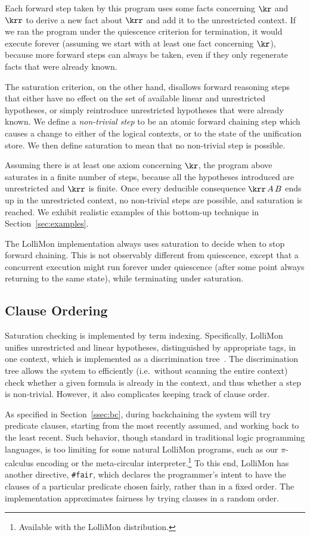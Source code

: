 \documentclass{sig-alt}
\begin{document}
Each forward step taken by this program uses some facts concerning
$\kr$ and $\krr$ to derive a new fact about $\krr$ and add it to the
unrestricted context.  If we ran the program under the quiescence
criterion for termination, it would execute forever (assuming we
start with at least one fact concerning $\kr$), because more forward
steps can always be taken, even if they only regenerate facts that
were already known.

The saturation criterion, on the other hand, disallows forward
reasoning steps that either have no effect on the set of available
linear and unrestricted hypotheses, or simply reintroduce unrestricted
hypotheses that were already known.  We define a \emph{non-trivial
  step} to be an atomic forward chaining step which causes a change to
either of the logical contexts, or to the state of the unification
store.  We then define saturation to mean that no non-trivial step is
possible.

Assuming there is at least one axiom concerning $\kr$, the program above
saturates in a finite number of steps, because all the hypotheses
introduced are unrestricted and $\krr$ is finite.  Once every
deducible consequence $\krr\,A\,B$ ends up in the unrestricted context,
no non-trivial steps are possible, and saturation is reached.  We exhibit
realistic examples of this bottom-up technique in
Section~\ref{sec:examples}.

The LolliMon implementation always uses saturation to decide when to
stop forward chaining.  This is not observably different from quiescence,
except that a concurrent execution might run forever under quiescence
(after some point always returning to the same state), while terminating
under saturation.

\subsection{Clause Ordering}
\label{ssec:ordering}
Saturation checking is implemented by
term indexing.  Specifically, LolliMon unifies unrestricted and linear
hypotheses, distinguished by
appropriate tags, in one context, which is implemented as a discrimination
tree~\cite{RSV01}.  The discrimination tree allows the
system to efficiently (i.e.\ without scanning the entire context) check
whether a given formula is already in the context, and thus whether a
step is non-trivial. However, it also complicates keeping track of clause
order.  

As specified in Section~\ref{ssec:bc}, during backchaining the
system will try predicate clauses, starting from
the most recently assumed, and working back to the least recent.
Such behavior, though standard in traditional logic
programming languages, is too limiting for some natural LolliMon
programs, such as our $\pi$-calculus encoding or the meta-circular
interpreter.\footnote{Available with the LolliMon distribution.}  To this
end, LolliMon has another directive, \texttt{\#{}fair}, which
declares the programmer's intent to have the clauses of a particular
predicate chosen fairly, rather than in a fixed order. The
implementation approximates fairness by trying clauses in a random
order.
\end{document}
